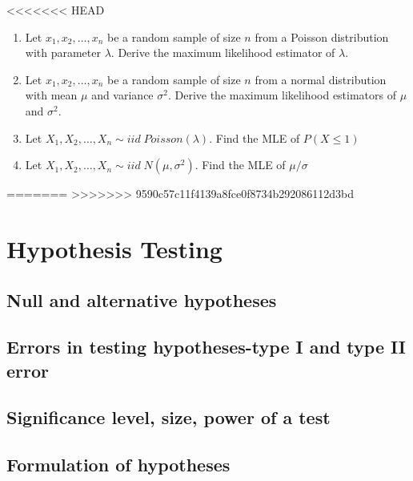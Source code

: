\documentclass[]{book}
\begin{document}
<<<<<<< HEAD
\begin{enumerate}
\def\labelenumi{\arabic{enumi}.}
\setcounter{enumi}{6}
\item
  Let \(x_1, x_2, \dots, x_n\) be a random sample of size \(n\) from a Poisson distribution with parameter \(\lambda\). Derive the maximum likelihood estimator of \(\lambda\).
\item
  Let \(x_1, x_2, \dots, x_n\) be a random sample of size \(n\) from a normal distribution with mean \(\mu\) and variance \(\sigma^2\). Derive the maximum likelihood estimators of \(\mu\) and \(\sigma^2\).
\item
  Let \(X_1, X_2, \dots, X_n \sim iid \; Poisson (\lambda)\). Find the MLE of \(P(X\leq 1)\)
\item
  Let \(X_1, X_2, \dots, X_n \sim iid \; N (\mu, \sigma^2)\). Find the MLE of \(\mu/\sigma\)
\end{enumerate}

=======
>>>>>>> 9590c57c11f4139a8fce0f8734b292086112d3bd
\hypertarget{hypothesis-testing}{%
\chapter{Hypothesis Testing}\label{hypothesis-testing}}

\hypertarget{null-and-alternative-hypotheses}{%
\section{Null and alternative hypotheses}\label{null-and-alternative-hypotheses}}

\hypertarget{errors-in-testing-hypotheses-type-i-and-type-ii-error}{%
\section{Errors in testing hypotheses-type I and type II error}\label{errors-in-testing-hypotheses-type-i-and-type-ii-error}}

\hypertarget{significance-level-size-power-of-a-test}{%
\section{Significance level, size, power of a test}\label{significance-level-size-power-of-a-test}}

\hypertarget{formulation-of-hypotheses}{%
\section{Formulation of hypotheses}\label{formulation-of-hypotheses}}
\end{document}
